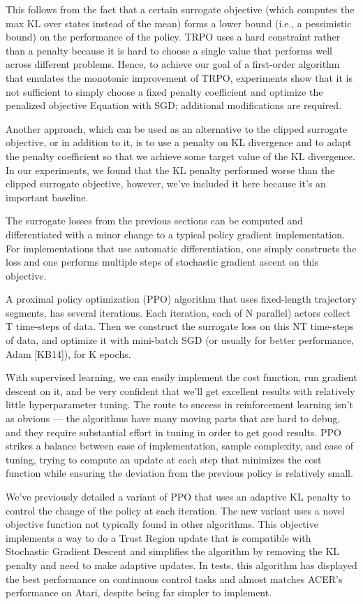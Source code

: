\documentclass[conference]{IEEEtran}
\begin{document}
This follows from the fact that a certain surrogate objective (which computes the max KL over states instead of the mean) forms a lower bound (i.e., a pessimistic bound) on the performance of the policy. TRPO uses a hard constraint rather than a penalty because it is hard to choose a single value that performs well across different problems. Hence, to achieve our goal of a first-order algorithm that emulates the monotonic improvement of TRPO, experiments show that it is not sufficient to simply choose a fixed penalty coefficient and optimize the penalized objective Equation with SGD; additional modifications are required.

Another approach, which can be used as an alternative to the clipped surrogate objective, or in addition to it, is to use a penalty on KL divergence and to adapt the penalty coefficient so that we achieve some target value of the KL divergence. In our experiments, we found that the KL penalty performed worse than the clipped surrogate objective, however, we’ve included it here because it’s an important baseline.

The surrogate losses from the previous sections can be computed and differentiated with a minor change to a typical policy gradient implementation. For implementations that use automatic differentiation, one simply constructs the loss and one performs multiple steps of stochastic gradient ascent on this objective.

A proximal policy optimization (PPO) algorithm that uses fixed-length trajectory segments, has several iterations. Each iteration, each of N  parallel) actors collect T time-steps of data. Then we construct the surrogate loss on this NT time-steps of data, and optimize it with mini-batch SGD (or usually for better performance, Adam [KB14]), for K epochs.

With supervised learning, we can easily implement the cost function, run gradient descent on it, and be very confident that we’ll get excellent results with relatively little hyperparameter tuning. The route to success in reinforcement learning isn’t as obvious — the algorithms have many moving parts that are hard to debug, and they require substantial effort in tuning in order to get good results. PPO strikes a balance between ease of implementation, sample complexity, and ease of tuning, trying to compute an update at each step that minimizes the cost function while ensuring the deviation from the previous policy is relatively small.

We’ve previously detailed a variant of PPO that uses an adaptive KL penalty to control the change of the policy at each iteration. The new variant uses a novel objective function not typically found in other algorithms. This objective implements a way to do a Trust Region update that is compatible with Stochastic Gradient Descent and simplifies the algorithm by removing the KL penalty and need to make adaptive updates. In tests, this algorithm has displayed the best performance on continuous control tasks and almost matches ACER’s performance on Atari, despite being far simpler to implement.
\end{document}
